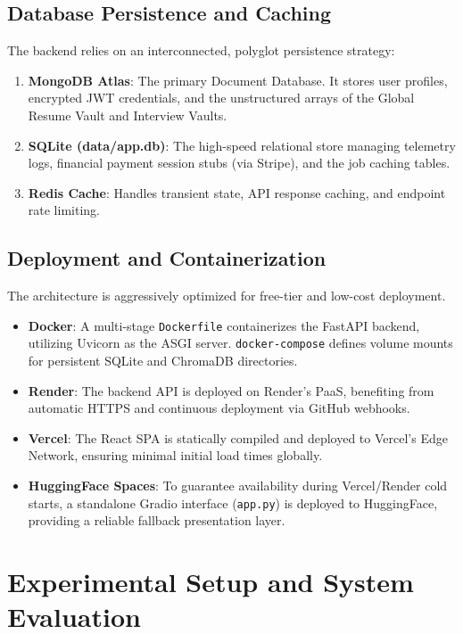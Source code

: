 \documentclass[10pt,journal,compsoc]{IEEEtran}
\begin{document}
\subsection{Database Persistence and Caching}
The backend relies on an interconnected, polyglot persistence strategy:
\begin{enumerate}
    \item \textbf{MongoDB Atlas}: The primary Document Database. It stores user profiles, encrypted JWT credentials, and the unstructured arrays of the Global Resume Vault and Interview Vaults.
    \item \textbf{SQLite (data/app.db)}: The high-speed relational store managing telemetry logs, financial payment session stubs (via Stripe), and the job caching tables.
    \item \textbf{Redis Cache}: Handles transient state, API response caching, and endpoint rate limiting.
\end{enumerate}

\subsection{Deployment and Containerization}
The architecture is aggressively optimized for free-tier and low-cost deployment. 
\begin{itemize}
    \item \textbf{Docker}: A multi-stage \texttt{Dockerfile} containerizes the FastAPI backend, utilizing Uvicorn as the ASGI server. \texttt{docker-compose} defines volume mounts for persistent SQLite and ChromaDB directories.
    \item \textbf{Render}: The backend API is deployed on Render's PaaS, benefiting from automatic HTTPS and continuous deployment via GitHub webhooks.
    \item \textbf{Vercel}: The React SPA is statically compiled and deployed to Vercel's Edge Network, ensuring minimal initial load times globally.
    \item \textbf{HuggingFace Spaces}: To guarantee availability during Vercel/Render cold starts, a standalone Gradio interface (\texttt{app.py}) is deployed to HuggingFace, providing a reliable fallback presentation layer.
\end{itemize}


\section{Experimental Setup and System Evaluation}\label{sec:evaluation}
\end{document}
